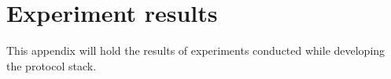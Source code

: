 \chapter{Experiment results}\label{app:experiments}
This appendix will hold the results of experiments conducted while developing the protocol stack.